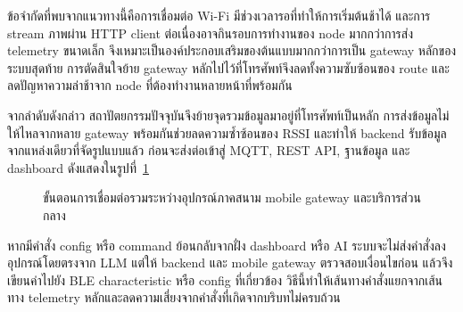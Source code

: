 ข้อจำกัดที่พบจากแนวทางนี้คือการเชื่อมต่อ Wi-Fi มีช่วงเวลารอที่ทำให้การเริ่มต้นช้าได้ และการ stream ภาพผ่าน HTTP client ต่อเนื่องอาจกินรอบการทำงานของ node มากกว่าการส่ง telemetry ขนาดเล็ก จึงเหมาะเป็นองค์ประกอบเสริมของต้นแบบมากกว่าการเป็น gateway หลักของระบบสุดท้าย การตัดสินใจย้าย gateway หลักไปไว้ที่โทรศัพท์จึงลดทั้งความซับซ้อนของ route และลดปัญหาความล่าช้าจาก node ที่ต้องทำงานหลายหน้าที่พร้อมกัน

จากลำดับดังกล่าว สถาปัตยกรรมปัจจุบันจึงย้ายจุดรวมข้อมูลมาอยู่ที่โทรศัพท์เป็นหลัก การส่งข้อมูลไม่ให้ไหลจากหลาย gateway พร้อมกันช่วยลดความซ้ำซ้อนของ RSSI และทำให้ backend รับข้อมูลจากแหล่งเดียวที่จัดรูปแบบแล้ว ก่อนจะส่งต่อเข้าสู่ MQTT, REST API, ฐานข้อมูล และ dashboard ดังแสดงในรูปที่~\ref{fig:ch3-gateway-flow}

\begin{figure}[!htbp]
    \centering
    \caption{ขั้นตอนการเชื่อมต่อรวมระหว่างอุปกรณ์ภาคสนาม mobile gateway และบริการส่วนกลาง}
    \label{fig:ch3-gateway-flow}
\end{figure}
\FloatBarrier

หากมีคำสั่ง config หรือ command ย้อนกลับจากฝั่ง dashboard หรือ AI ระบบจะไม่ส่งคำสั่งลงอุปกรณ์โดยตรงจาก LLM แต่ให้ backend และ mobile gateway ตรวจสอบเงื่อนไขก่อน แล้วจึงเขียนค่าไปยัง BLE characteristic หรือ config ที่เกี่ยวข้อง วิธีนี้ทำให้เส้นทางคำสั่งแยกจากเส้นทาง telemetry หลักและลดความเสี่ยงจากคำสั่งที่เกิดจากบริบทไม่ครบถ้วน

